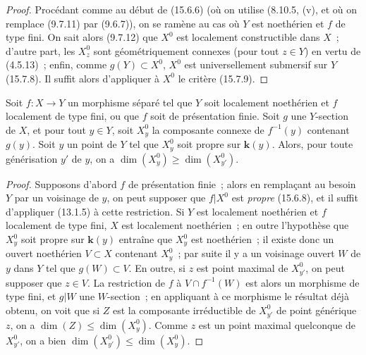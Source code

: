 \begin{proof}
Procédant comme au début de (15.6.6) (où on utilise (8.10.5, (v), et où on remplace (9.7.11) par (9.6.7)), on se ramène au cas où $Y$ est noethérien et $f$ de type fini. On sait alors (9.7.12) que $X^0$ est localement constructible dans $X$~; d'autre part, les $X_z^0$ sont géométriquement connexes (pour tout $z\in Y$) en vertu de (4.5.13)~; enfin, comme $g(Y)\subset X^0$, $X^0$ est universellement submersif sur $Y$ (15.7.8). Il suffit alors d'appliquer à $X^0$ le critère (15.7.9).
\end{proof}

\begin{corollary}[15.6.9]
\label{IV.15.6.9-fr}
Soit $f:X\to Y$ un morphisme séparé tel que $Y$ soit localement noethérien et $f$ localement de type fini, \textup{ou} que $f$ soit de présentation finie. Soit $g$ une $Y$-section de $X$, et pour tout $y\in Y$, soit $X_y^0$ la composante connexe de $f^{-1}(y)$ contenant $g(y)$. Soit $y$ un point de $Y$ tel que $X_y^0$ soit propre sur $\boldsymbol{k}(y)$. Alors, pour toute générisation $y'$ de $y$, on a $\dim(X_y^0)\geqslant\dim(X_{y'}^0)$.
\end{corollary}

\begin{proof}
Supposons d'abord $f$ de présentation finie~; alors en remplaçant au besoin $Y$ par un voisinage de $y$, on peut supposer que $f|X^0$ est \emph{propre} (15.6.8), et il suffit d'appliquer (13.1.5) à cette restriction. Si $Y$ est localement noethérien et $f$ localement de type fini, $X$ est localement noethérien~; en outre l'hypothèse que $X_y^0$ soit propre sur $\boldsymbol{k}(y)$ entraîne que $X_y^0$ est noethérien~; il existe donc un ouvert noethérien $V\subset X$ contenant $X_y^0$~; par suite il y a un voisinage ouvert $W$ de $y$ dans $Y$ tel que $g(W)\subset V$. En outre, si $z$ est point maximal de $X_{y'}^0$, on peut supposer que $z\in V$. La restriction de $f$ à $V\cap f^{-1}(W)$ est alors un morphisme de type fini, et $g|W$ une $W$-section~; en appliquant à ce morphisme le résultat déjà obtenu, on voit que si $Z$ est la composante irréductible de $X_{y'}^0$ de point générique $z$, on a $\dim(Z)\leqslant\dim(X_y^0)$. Comme $z$ est un point maximal quelconque de $X_{y'}^0$, on a bien $\dim(X_{y'}^0)\leqslant\dim(X_y^0)$.
\end{proof}

